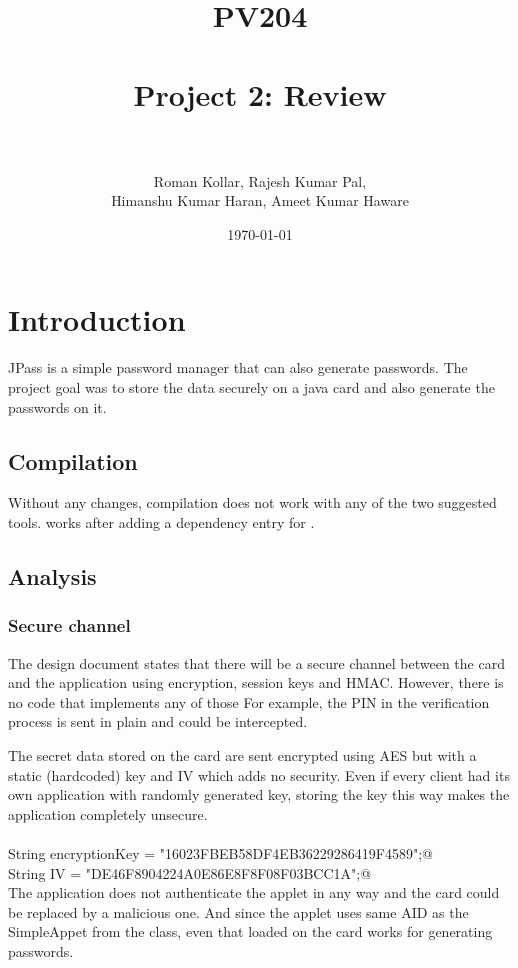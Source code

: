 \documentclass[paper=a4, fontsize=12pt]{scrartcl}
\title{
\normalfont \normalsize
\textsc{PV204} \\ [25pt]
\horrule{0.5pt} \\[0.4cm]
\huge Project 2: Review  \\
\horrule{0.5pt} \\[0.5cm]
}
\author{Roman Kollar, Rajesh Kumar Pal,\\Himanshu Kumar Haran, Ameet Kumar Haware}
\date{\normalsize\today}
\begin{document}
\maketitle

\section{Introduction}
JPass is a simple password manager that can also generate passwords.
The project goal was to store the data securely on a java card and also generate the passwords on it.

\subsection{Compilation}
Without any changes, compilation does not work with any of the two suggested tools.
\verb@Maven@ works after adding a dependency entry for \verb@jcardsim@.

\subsection{Analysis}
\subsubsection{Secure channel}
The design document states that there will be a secure channel between the card and the application using encryption, session keys and HMAC.
However, there is no code that implements any of those
For example, the PIN in the verification process is sent in plain and could be intercepted.

The secret data stored on the card are sent encrypted using AES but with a static (hardcoded) key and IV which adds no security.
Even if every client had its own application with randomly generated key, storing the key this way makes the application completely unsecure.\\
\\
\verb@          String encryptionKey = "16023FBEB58DF4EB36229286419F4589";@\\
\verb@          String IV = "DE46F8904224A0E86E8F8F08F03BCC1A";@
\\

The application does not authenticate the applet in any way and the card could be replaced by a malicious one.
And since the applet uses same AID as the SimpleAppet from the class, even that loaded on the card works for generating passwords.
\end{document}
